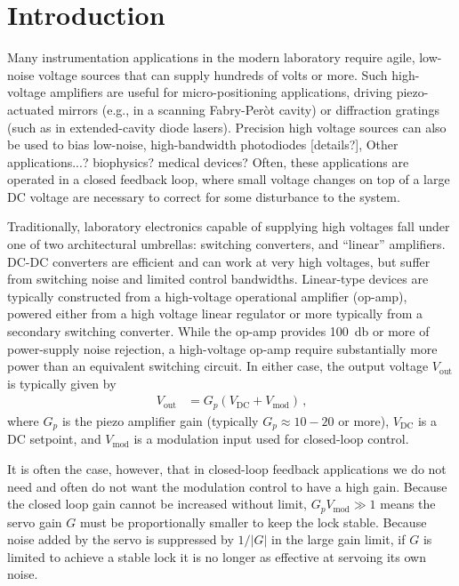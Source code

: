 \documentclass[aip,rsi,reprint]{revtex4-1} %
\begin{document}
\section{Introduction}
\label{Sec:Introduction}

Many instrumentation applications in the modern laboratory require agile, low-noise voltage sources that can supply hundreds of volts or more.
Such high-voltage amplifiers are useful for micro-positioning applications, driving piezo-actuated mirrors (e.g., in a scanning Fabry-Per{\`o}t cavity) or diffraction gratings (such as in extended-cavity diode lasers).
Precision high voltage sources can also be used to bias low-noise, high-bandwidth photodiodes [details?], Other applications...? biophysics? medical devices?
Often, these applications are operated in a closed feedback loop, where small voltage changes on top of a large DC voltage are necessary to correct for some disturbance to the system.

Traditionally, laboratory electronics capable of supplying high voltages fall under one of two architectural umbrellas: switching converters, and ``linear'' amplifiers.
DC-DC converters are efficient and can work at very high voltages, but suffer from switching noise and limited control bandwidths.
Linear-type devices are typically constructed from a high-voltage operational amplifier (op-amp), powered either from a high voltage linear regulator or more typically from a secondary switching converter.
While the op-amp provides \SI{100}{\decibel} or more of power-supply noise rejection, a high-voltage op-amp require substantially more power than an equivalent switching circuit.
In either case, the output voltage  $V_{\text{out}}$ is typically given by
\begin{align}
  V_{\text{out}} &= G_p(V_{\text{DC}} + V_{\text{mod}})\, \text{,}
\end{align}
where $G_p$ is the piezo amplifier gain (typically {$G_p\approx \num{10} - \num{20}$} or more), $V_{\text{DC}}$ is a DC setpoint, and $V_{\text{mod}}$ is a modulation input used for closed-loop control.

It is often the case, however, that in closed-loop feedback applications we do not need and often do not want the modulation control to have a high gain.
Because the closed loop gain cannot be increased without limit, $G_p V_{\text{mod}} \gg 1$ means the servo gain $G$ must be proportionally smaller to keep the lock stable.
Because noise added by the servo is suppressed by $1/|G|$ in the large gain limit, if $G$ is limited to achieve a stable lock it is no longer as effective at servoing its own noise.
\end{document}
